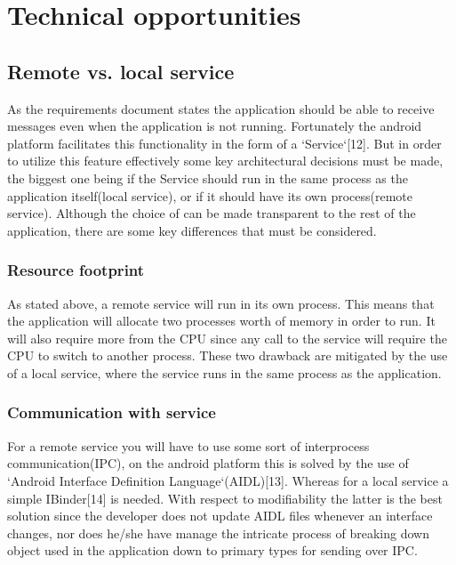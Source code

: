 

\section{Technical opportunities}

\subsection{Remote vs. local service}

As the requirements document states the application should be able to receive messages even when the application is not running. Fortunately the android platform facilitates this functionality in the form of a `Service`[12]. But in order to utilize this feature effectively some key architectural decisions must be made, the biggest one being if the Service should run in the same process as the application itself(local service), or if it should have its own process(remote service). Although the choice of can be made transparent to the rest of the application, there are some key differences that must be considered.

\subsubsection{Resource footprint}
As stated above, a remote service will run in its own process. This means that the application will allocate two processes worth of memory in order to run. It will also require more from the CPU since any call to the service will require the CPU to switch to another process. These two drawback are mitigated by the use of a local service, where the service runs in the same process as the application. 

\subsubsection{Communication with service}
For a remote service you will have to use some sort of  interprocess communication(IPC), on the android platform this is solved by the use of `Android Interface Definition Language`(AIDL)[13]. Whereas for a local service a simple IBinder[14] is needed. With respect to modifiability the latter is the best solution since the developer does not update AIDL files whenever an interface changes, nor does he/she have manage the intricate process of breaking down object used in the application down to primary types for sending over IPC. 



